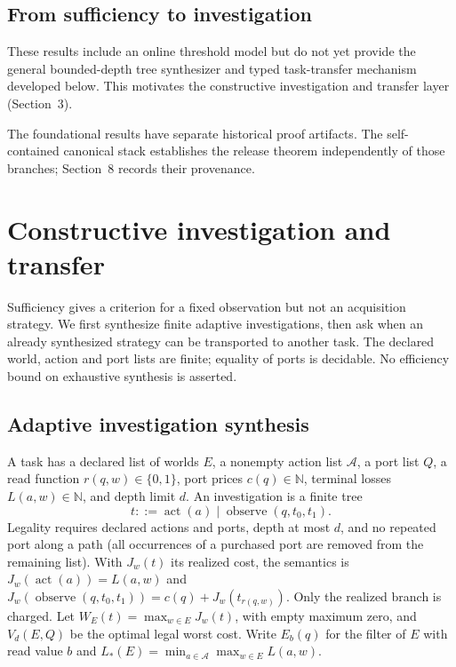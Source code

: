 \documentclass[10pt,letterpaper]{article}
\newcommand{\Nat}{\mathbb N}
\begin{document}
\subsection{From sufficiency to investigation}
These results include an online threshold model but do not yet provide the general bounded-depth tree synthesizer and typed task-transfer mechanism developed below. This motivates the constructive investigation and transfer layer (Section~3).

The foundational results have separate historical proof artifacts. The self-contained canonical stack establishes the release theorem independently of those branches; Section~8 records their provenance.
\clearpage
\section{Constructive investigation and transfer}\label{sec:investigation}
Sufficiency gives a criterion for a fixed observation but not an acquisition strategy. We first synthesize finite adaptive investigations, then ask when an already synthesized strategy can be transported to another task. The declared world, action and port lists are finite; equality of ports is decidable. No efficiency bound on exhaustive synthesis is asserted.

\subsection{Adaptive investigation synthesis}
A task has a declared list of worlds $E$, a nonempty action list $\mathcal A$, a port list $Q$, a read function $r(q,w)\in\{0,1\}$, port prices $c(q)\in\Nat$, terminal losses $L(a,w)\in\Nat$, and depth limit $d$. An investigation is a finite tree
\[
 t ::= \operatorname{act}(a)\mid\operatorname{observe}(q,t_0,t_1).
\]
Legality requires declared actions and ports, depth at most $d$, and no repeated port along a path (all occurrences of a purchased port are removed from the remaining list). With $J_w(t)$ its realized cost, the semantics is $J_w(\operatorname{act}(a))=L(a,w)$ and $J_w(\operatorname{observe}(q,t_0,t_1))=c(q)+J_w(t_{r(q,w)})$. Only the realized branch is charged. Let $W_E(t)=\max_{w\in E}J_w(t)$, with empty maximum zero, and $V_d(E,Q)$ be the optimal legal worst cost. Write $E_b(q)$ for the filter of $E$ with read value $b$ and $L_*(E)=\min_{a\in\mathcal A}\max_{w\in E}L(a,w)$.
\end{document}
